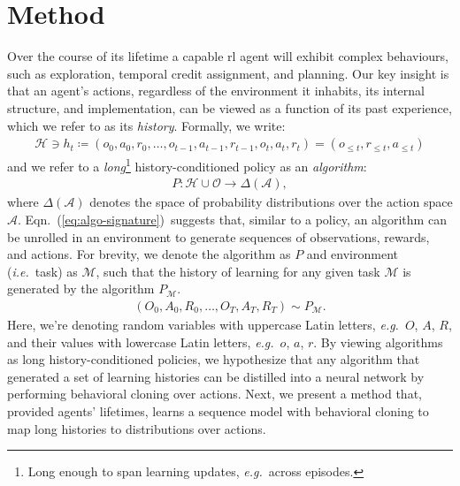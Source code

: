 \documentclass{article}
\theoremstyle{thm}
\newcommand{\eqnref}[1]{Eqn.~({\ref{#1}})}
\newcommand{\defeq}{\coloneqq}
\newcommand{\algo}{\ensuremath{P}}
\newcommand{\eg}{{\it e.g.}}
\newcommand{\ie}{{\it i.e.}}
\begin{document}
\section{Method}
\label{sec:method}
 Over the course of its lifetime a capable \acrfull{rl} agent will exhibit complex behaviours, such as exploration, temporal credit assignment, and planning. Our key insight is that an agent's actions, regardless of the environment it inhabits, its internal structure, and implementation, can be viewed as a function of its past experience, which we refer to as its \emph{history}. Formally, we write:
\begin{align}
  \mathcal{H} \ni h_{t} \defeq \left( o_{0}, a_{0}, r_{0}, \ldots, o_{t-1}, a_{t-1}, r_{t-1}, o_{t}, a_{t}, r_{t} \right) = \left( o_{\leq t}, r_{\leq t}, a_{\leq t}  \right)
\end{align}
and we refer to a \emph{long}\footnote{
  Long enough to span learning updates, \eg~across episodes.
  }
history-conditioned policy as an \emph{algorithm}:
\begin{align}
  \algo: \mathcal{H}  \cup \mathcal{O} \rightarrow \Delta(\mathcal{A}),
\label{eq:algo-signature}
\end{align}
where $\Delta(\mathcal{A})$ denotes the space of probability distributions over the action space $\mathcal{A}$.
\eqnref{eq:algo-signature}~suggests that, similar to a policy, an algorithm can be unrolled in an environment to generate sequences of observations, rewards, and actions.
For brevity, we denote the algorithm as $\algo$ and environment (\ie~task) as $\mathcal{M}$, such that the history of learning for any given task $\mathcal{M}$ is generated by the algorithm $\algo_{\mathcal{M}}$.
\begin{align}
  \left( O_{0}, A_{0}, R_{0}, \ldots, O_{T}, A_{T}, R_{T} \right) \sim \algo_{\mathcal{M}}.
\end{align}
Here, we're denoting random variables with uppercase Latin letters, \eg~$O$, $A$, $R$, and their values with lowercase Latin letters, \eg~$o$, $a$, $r$.
By viewing algorithms as long history-conditioned policies, we hypothesize that any algorithm that generated a set of learning histories can be distilled into a neural network by performing behavioral cloning over actions.
Next, we present a method that, provided agents' lifetimes, learns a sequence model with behavioral cloning to map long histories to distributions over actions.
\end{document}
